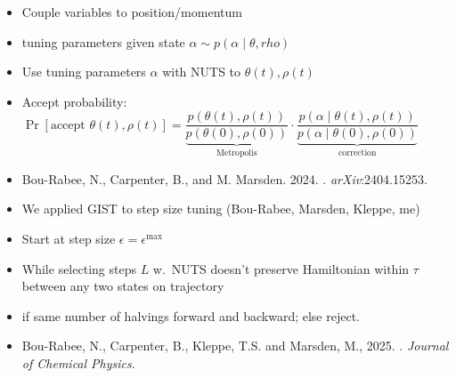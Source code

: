 \documentclass[10pt]{report}
\begin{document}
\begin{itemize}
\item Couple  variables to position/momentum
\item {} tuning parameters given state $\alpha \sim p(\alpha \mid \theta, rho)$
\item Use tuning parameters $\alpha$ with NUTS to  $\theta(t), \rho(t)$
\item Accept probability:
  $
  \Pr[\textrm{accept } \theta(t), \rho(t)]
  = \dfrac{p(\theta(t), \rho(t))}{\underbrace{p(\theta(0), \rho(0))}_\textrm{Metropolis}}
    \cdot 
    \dfrac{p(\alpha \mid \theta(t), \rho(t))}{\underbrace{p(\alpha \mid \theta(0), \rho(0))}_\textrm{correction}}
    $
\item {\small Bou-Rabee, N., Carpenter, B., and
    M. Marsden. 2024. .
    {\slshape arXiv}:2404.15253.}
\end{itemize}

\begin{itemize}
\item We applied GIST to step size tuning (Bou-Rabee, Marsden, Kleppe, me)
\item Start at step size $\epsilon = \epsilon^\textrm{max}$
\item While selecting steps $L$ w.\ NUTS doesn't preserve Hamiltonian within $\tau$ between any two states on trajectory
  \item {} if same number of halvings forward and backward; else reject.
    \vspace*{-12pt}
  \vfill
  \item {\small Bou-Rabee, N., Carpenter, B., Kleppe, T.S. and
      Marsden, M., 2025. . \textit{Journal of Chemical Physics}.}
\end{itemize}
\end{document}
